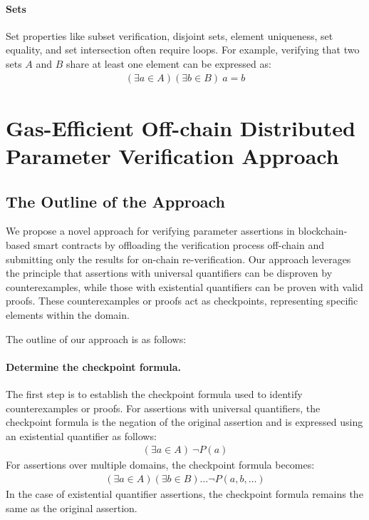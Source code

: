 \documentclass[runningheads]{llncs}
\begin{document}
\paragraph{\textbf{Sets}}
Set properties like subset verification, disjoint sets, element uniqueness, set equality, and set intersection often require loops. For example, verifying that two sets \(A\) and \(B\) share at least one element can be expressed as:
\begin{gather*}
(\exists a \in A) (\exists b \in B)\ a = b
\end{gather*}
\section{Gas-Efficient Off-chain Distributed Parameter Verification Approach}
\label{sec:offchain-distributed-verification-approach}
\subsection{The Outline of the Approach}
We propose a novel approach for verifying parameter assertions in blockchain-based smart contracts by offloading the verification process off-chain and submitting only the results for on-chain re-verification. 
Our approach leverages the principle that assertions with universal quantifiers can be disproven by counterexamples, while those with existential quantifiers can be proven with valid proofs. These counterexamples or proofs act as checkpoints, representing specific elements within the domain.

The outline of our approach is as follows:
\paragraph{\textbf{Determine the checkpoint formula.}}
The first step is to establish the checkpoint formula used to identify counterexamples or proofs. For assertions with universal quantifiers, the checkpoint formula is the negation of the original assertion and is expressed using an existential quantifier as follows: 
\begin{gather}
\label{eq:9}
(\exists a \in A) \ \neg P(a)
\end{gather}
For assertions over multiple domains, the checkpoint formula becomes:
\begin{gather}
\label{eq:10}
(\exists a \in A) (\exists b \in B) \dots  \neg P(a, b, \dots)
\end{gather}
In the case of existential quantifier assertions, the checkpoint formula remains the same as the original assertion.
\end{document}
